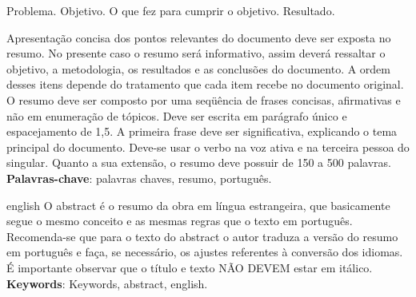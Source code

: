 \setlength{\absparsep}{18pt} %
\begin{resumo}

    Problema. Objetivo. O que fez para cumprir o objetivo. Resultado.

    Apresentação concisa dos pontos relevantes do documento deve ser exposta no resumo. No presente caso o resumo será informativo, assim deverá ressaltar o objetivo, a metodologia, os resultados e as conclusões do documento. A ordem desses itens depende do tratamento que cada item recebe no documento original. O resumo deve ser composto por uma seqüência de frases concisas, afirmativas e não em enumeração de tópicos. Deve ser escrita em parágrafo único e espacejamento de 1,5. A primeira frase deve ser significativa, explicando o tema principal do documento. Deve-se usar o verbo na voz ativa e na terceira pessoa do singular. Quanto a sua extensão, o resumo deve possuir de 150 a 500 palavras.   
    \vspace{\onelineskip}
    \noindent
    \textbf{Palavras-chave}: palavras chaves, resumo, português.
\end{resumo}

\begin{resumo}[Abstract]
    \begin{otherlanguage*}{english}
        O abstract é o resumo da obra em língua estrangeira, que basicamente segue o mesmo conceito e as mesmas regras que o texto em português. Recomenda-se que para o texto do abstract o autor traduza a versão do resumo em português e faça, se necessário, os ajustes referentes à conversão dos idiomas. É importante observar que o título e texto NÃO DEVEM estar em itálico.
	    \vspace{\onelineskip}
	    \noindent
	    \\
	    \textbf{Keywords}: Keywords, abstract, english.
    \end{otherlanguage*}
\end{resumo}
